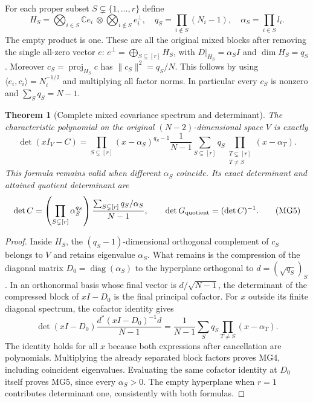 \documentclass[11pt,a4paper]{article}
\newtheorem{theorem}{Theorem}[section]
\theoremstyle{definition}\newtheorem{definition}[theorem]{Definition}
\newcommand{\C}{\mathbb C}\newcommand{\R}{\mathbb R}
\begin{document}
For each proper subset $S\subsetneq\{1,\ldots,r\}$ define
\[
 H_S=\bigotimes_{i\in S}\C e_i\ \otimes
            \bigotimes_{i\notin S}e_i^\perp,
 \quad q_S=\prod_{i\notin S}(N_i-1),
 \quad \alpha_S=\prod_{i\in S}l_i.
 \tag{MG3}\label{mg:blocks}
\]
The empty product is one. These are all the original mixed blocks
after removing the single all-zero vector $e$:
$e^\perp=\bigoplus_{S\subsetneq[r]}H_S$, with
$D|_{H_S}=\alpha_SI$ and $\dim H_S=q_S$.
Moreover $c_S=\operatorname{proj}_{H_S}c$ has
$\|c_S\|^2=q_S/N$. This follows by using
$\langle e_i,c_i\rangle=N_i^{-1/2}$ and multiplying all factor
norms. In particular every $c_S$ is nonzero and
$\sum_Sq_S=N-1$.

\begin{theorem}[Complete mixed covariance spectrum and determinant]
The characteristic polynomial on the original $(N-2)$-dimensional
space $V$ is exactly
\[
 \det(xI_V-C)=
 \prod_{S\subsetneq[r]}(x-\alpha_S)^{q_S-1}
 \frac{1}{N-1}
 \sum_{S\subsetneq[r]}q_S
       \prod_{\substack{T\subsetneq[r]\\T\ne S}}(x-\alpha_T).
 \tag{MG4}\label{mg:polynomial}
\]
This formula remains valid when different $\alpha_S$ coincide.
Its exact determinant and attained quotient determinant are
\[
 \det C=
 \left(\prod_{S\subsetneq[r]}\alpha_S^{q_S}\right)
 \frac{\sum_{S\subsetneq[r]}q_S/\alpha_S}{N-1},
 \qquad \det G_{\rm quotient}=(\det C)^{-1}.
 \tag{MG5}\label{mg:determinant}
\]
\end{theorem}
\begin{proof}
Inside $H_S$, the $(q_S-1)$-dimensional orthogonal complement of
$c_S$ belongs to $V$ and retains eigenvalue $\alpha_S$. What remains
is the compression of the diagonal matrix
$D_0=\operatorname{diag}(\alpha_S)$ to the hyperplane orthogonal
to $d=(\sqrt{q_S})_S$. In an orthonormal basis whose final vector
is $d/\sqrt{N-1}$, the determinant of the compressed block of
$xI-D_0$ is the final principal cofactor. For $x$ outside its
finite diagonal spectrum, the cofactor identity gives
\[
 \det(xI-D_0)\frac{d^*(xI-D_0)^{-1}d}{N-1}
 =\frac1{N-1}\sum_Sq_S\prod_{T\ne S}(x-\alpha_T).
\]
The identity holds for all $x$ because both expressions after
cancellation are polynomials. Multiplying the already separated
block factors proves MG4, including coincident eigenvalues.
Evaluating the same cofactor identity at $D_0$ itself proves
MG5, since every $\alpha_S>0$. The empty hyperplane when $r=1$
contributes determinant one, consistently with both formulas.
\end{proof}
\end{document}
